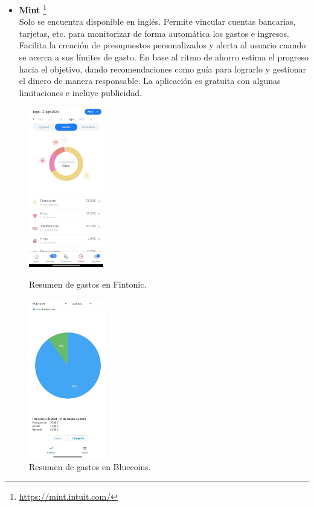 \begin{itemize}
    \item \textbf{Mint} \footnote{\url{https://mint.intuit.com/}} \\
    Solo se encuentra disponible en inglés. Permite vincular cuentas bancarias, tarjetas, etc. para monitorizar de forma 
    automática los gastos e ingresos. Facilita la creación de presupuestos personalizados y 
    alerta al usuario cuando se acerca a sus límites de gasto.
    En base al ritmo de ahorro estima el progreso hacia el objetivo, dando recomendaciones 
    como guía para lograrlo y gestionar el dinero de manera responsable. 
    La aplicación es gratuita con algunas limitaciones e incluye publicidad.
\end{itemize}

\begin{figure}[ht!]
    \centering
    \begin{minipage}{0.45\textwidth}
        \centering
        \includegraphics[height = 70mm]{imagenes/resumen-gastos-mes-fintonic.jpg}
        \caption{Resumen de gastos en Fintonic\cite{gastos-fintonic}.}
        \label{fig:resumen_gastos_mes_fintonic}
    \end{minipage}\hfill
    \begin{minipage}{0.45\textwidth}
        \centering
        \includegraphics[height = 70mm]{imagenes/resumen-gastos-bluecoins.jpg}
        \caption{Resumen de gastos en Bluecoins\cite{gastos-bluecoins}.}
        \label{fig:resumen_gastos_bluecoins}
    \end{minipage}
\end{figure}

